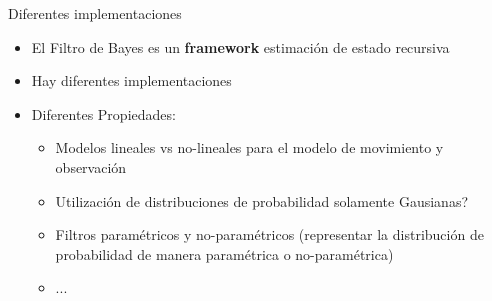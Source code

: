 \begin{frame}{Diferentes implementaciones}
    \begin{itemize}
        \item El Filtro de Bayes es un {\bf framework} estimación de estado recursiva
        \item Hay diferentes implementaciones
        \item Diferentes Propiedades:
        \begin{itemize}
            \item Modelos lineales vs no-lineales para el modelo de movimiento y observación
            \item Utilización de distribuciones de probabilidad solamente Gausianas? 
            \item Filtros paramétricos y no-paramétricos (representar la distribución de probabilidad de manera paramétrica o no-paramétrica)
            \item ...
        \end{itemize}
    \end{itemize}
    
\end{frame}


